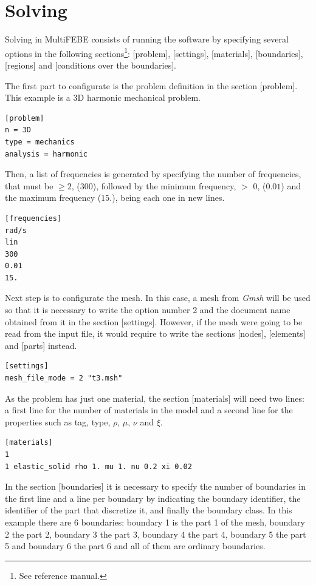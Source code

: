 \documentclass[a4]{article}
\begin{document}
\section{Solving}
Solving in MultiFEBE consists of running the software by specifying several options in the following sections\footnote{See reference manual.}: [problem], [settings], [materials], [boundaries], [regions] and [conditions over the boundaries].

The first part to configurate is the problem definition in the section [problem]. This example is a 3D harmonic mechanical problem.  

\begin{Verbatim}	
[problem]
n = 3D
type = mechanics
analysis = harmonic
\end{Verbatim}

Then, a list of frequencies is generated by specifying the number of frequencies, that must be $\geq 2$, (300), followed by the minimum frequency, $>$ 0, ($0.01$) and the maximum frequency ($15.$), being each one in new lines.

\begin{Verbatim}
[frequencies]
rad/s
lin
300
0.01
15.
\end{Verbatim}

Next step is to configurate the mesh. In this case, a mesh from \textit{Gmsh} will be used so that it is necessary to write the option number 2 and the document name obtained from it in the section [settings]. However, if the mesh were going to be read from the input file, it would require to write the sections [nodes], [elements] and [parts] instead.

\begin{Verbatim}	
[settings]
mesh_file_mode = 2 "t3.msh"
\end{Verbatim}

As the problem has just one material, the section [materials] will need two lines: a first line for the number of materials in the model and a second line for the properties such as tag, type, $\rho$, $\mu$, $\nu$ and $\xi$.

\begin{Verbatim}	
[materials]
1
1 elastic_solid rho 1. mu 1. nu 0.2 xi 0.02
\end{Verbatim}

In the section [boundaries] it is necessary to specify the number of boundaries in the first line and a line per boundary by indicating the boundary identifier,
the identifier of the part that discretize it, and finally the boundary class. In this example there are 6 boundaries: boundary 1 is the part 1 of the mesh, boundary 2 the part 2, boundary 3 the part 3, boundary 4 the part 4, boundary 5 the part 5 and boundary 6 the part 6 and all of them are ordinary boundaries.
\end{document}
